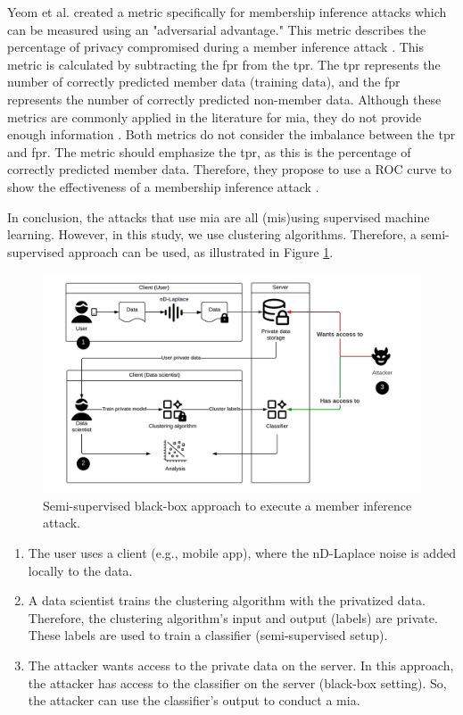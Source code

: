 Yeom et al. created a metric specifically for membership inference attacks which can be measured using an "adversarial advantage."
This metric describes the percentage of privacy compromised during a member inference attack \citep{yeom_privacy_2018}.
This metric is calculated by subtracting the \gls{fpr} from the \gls{tpr}.
The \gls{tpr} represents the number of correctly predicted member data (training data), and the \gls{fpr} represents the number of correctly predicted non-member data.
Although these metrics are commonly applied in the literature for \gls{mia}, they do not provide enough information \citep{carlini_membership_2022}.
Both metrics do not consider the imbalance between the \gls{tpr} and \gls{fpr}.
The metric should emphasize the \gls{tpr}, as this is the percentage of correctly predicted member data.
Therefore, they propose to use a ROC curve to show the effectiveness of a membership inference attack \citep{carlini_membership_2022}. \newline

In conclusion, the attacks that use \gls{mia} are all (mis)using supervised machine learning.
However, in this study, we use clustering algorithms.
Therefore, a semi-supervised approach can be used, as illustrated in Figure \ref{figure:MIA-semi-supervised}.
\newpage
\begin{figure}[h]
  \includegraphics[width=1\textwidth]{TheorethicalFramework/Differential privacy/master-thesis-MIA.png}
  \caption{Semi-supervised black-box approach to execute a member inference attack.}
  \label{figure:MIA-semi-supervised}
\end{figure}

\begin{enumerate}
  \item The user uses a client (e.g., mobile app), where the nD-Laplace noise is added locally to the data.
  \item A data scientist trains the clustering algorithm with the privatized data.
        Therefore, the clustering algorithm's input and output (labels) are private.
        These labels are used to train a classifier (semi-supervised setup).
  \item The attacker wants access to the private data on the server.
        In this approach, the attacker has access to the classifier on the server (black-box setting).
        So, the attacker can use the classifier's output to conduct a \gls{mia}.
\end{enumerate}
